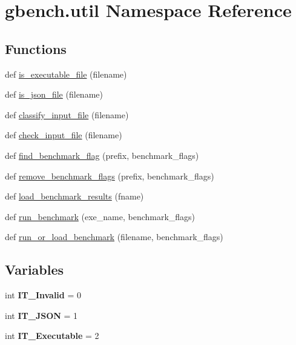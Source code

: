 \hypertarget{namespacegbench_1_1util}{}\section{gbench.\+util Namespace Reference}
\label{namespacegbench_1_1util}
\subsection*{Functions}
\begin{DoxyCompactItemize}
\item 
def \mbox{\hyperlink{namespacegbench_1_1util_ab892754dc0be3bbe4785bf4610a8cc76}{is\+\_\+executable\+\_\+file}} (filename)
\item 
def \mbox{\hyperlink{namespacegbench_1_1util_a2b5de1b1f7c12819da516c50fc1f433b}{is\+\_\+json\+\_\+file}} (filename)
\item 
def \mbox{\hyperlink{namespacegbench_1_1util_a25ee5a7452eb3618b88659be49dc48d8}{classify\+\_\+input\+\_\+file}} (filename)
\item 
def \mbox{\hyperlink{namespacegbench_1_1util_aa332d3ac64581e88c71debd765ebd14e}{check\+\_\+input\+\_\+file}} (filename)
\item 
def \mbox{\hyperlink{namespacegbench_1_1util_adb11119409b105a464f238f67d49a33f}{find\+\_\+benchmark\+\_\+flag}} (prefix, benchmark\+\_\+flags)
\item 
def \mbox{\hyperlink{namespacegbench_1_1util_ac9fcdf6c47eaec31a8ec561ab29f6968}{remove\+\_\+benchmark\+\_\+flags}} (prefix, benchmark\+\_\+flags)
\item 
def \mbox{\hyperlink{namespacegbench_1_1util_a815611aefc9668cc33bf88eefb3c0138}{load\+\_\+benchmark\+\_\+results}} (fname)
\item 
def \mbox{\hyperlink{namespacegbench_1_1util_ad31457115437aaf422451b7f302b36dd}{run\+\_\+benchmark}} (exe\+\_\+name, benchmark\+\_\+flags)
\item 
def \mbox{\hyperlink{namespacegbench_1_1util_a4ebe890db77f6434598541c4460602cb}{run\+\_\+or\+\_\+load\+\_\+benchmark}} (filename, benchmark\+\_\+flags)
\end{DoxyCompactItemize}
\subsection*{Variables}
\begin{DoxyCompactItemize}
\item 
\mbox{\label{namespacegbench_1_1util_a0bea0aaefd0d7dd4abccbce16673a471}} 
int {\bfseries I\+T\+\_\+\+Invalid} = 0
\item 
\mbox{\label{namespacegbench_1_1util_a56c9d1902f395f1d659cac30a394528e}} 
int {\bfseries I\+T\+\_\+\+J\+S\+ON} = 1
\item 
\mbox{\label{namespacegbench_1_1util_ac66353422071729cc237a1fd5ba8e74a}} 
int {\bfseries I\+T\+\_\+\+Executable} = 2
\end{DoxyCompactItemize}



